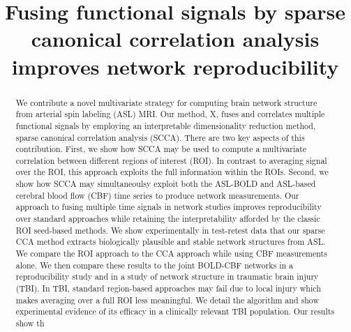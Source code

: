 \documentclass{llncs}
\title{Fusing functional signals by sparse canonical correlation analysis improves network reproducibility}
\begin{document}
\maketitle
\begin{abstract}
We contribute a novel multivariate strategy for computing brain network structure from arterial spin labeling (ASL) MRI.  Our method, X, fuses and correlates multiple functional signals by employing an interpretable dimensionality reduction method, sparse canonical correlation analysis (SCCA).  There are two key aspects of this contribution.  First, we show how SCCA may be used to compute a multivariate correlation between different regions of interest (ROI).  In contrast to averaging signal over the ROI, this approach exploits the full information within the ROIs.  Second, we show how SCCA may simultaneoulsy exploit both the ASL-BOLD and ASL-based cerebral blood flow (CBF) time series to produce network measurements.  Our approach to fusing multiple time signals in network studies improves reproducibility over standard approaches while retaining the interpretability afforded by the classic ROI seed-based methods.  We show experimentally in test-retest data that our sparse CCA method extracts biologically plausible and stable network structures from ASL.  We compare the ROI approach to the CCA approach while using CBF measurements alone.  We then compare these results to the joint BOLD-CBF networks in a reproducibility study and in a study of network structure in traumatic brain injury (TBI).  In TBI, standard region-based approaches may fail due to local injury which makes averaging over a full ROI less meaningful.  We detail the algorithm and show experimental evidence of its efficacy in a clinically relevant TBI population.  Our results show th
\end{abstract}
\end{document}
